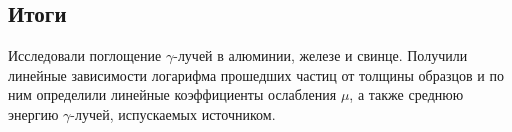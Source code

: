 \documentclass{lab}
\begin{document}
\subsection*{Итоги}

Исследовали поглощение $\gamma$-лучей в алюминии, железе и свинце. Получили линейные 
зависимости логарифма прошедших частиц от толщины образцов и по ним определили линейные 
коэффициенты ослабления $\mu$, а также среднюю энергию $\gamma$-лучей, испускаемых 
источником.
\end{document}
